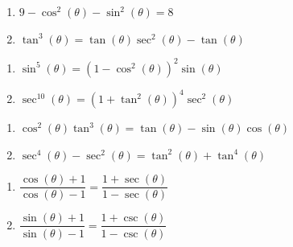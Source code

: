 \begin{multicols}{2}

\begin{enumerate}

\setcounter{enumi}{\value{HW}}

\item $9 - \cos^{2}(\theta) - \sin^{2}(\theta) = 8$
\item $\tan^{3}(\theta) = \tan(\theta)\sec^{2}(\theta) - \tan(\theta)$

\setcounter{HW}{\value{enumi}}

\end{enumerate}

\end{multicols}

\begin{multicols}{2}

\begin{enumerate}

\setcounter{enumi}{\value{HW}}

\item $\sin^{5}(\theta) = \left(1-\cos^{2}(\theta)\right)^{2} \sin(\theta)$
\item $\sec^{10}(\theta) = \left(1 + \tan^{2}(\theta)\right)^4 \sec^{2}(\theta)$

\setcounter{HW}{\value{enumi}}

\end{enumerate}

\end{multicols}

\begin{multicols}{2}

\begin{enumerate}

\setcounter{enumi}{\value{HW}}

\item $\cos^{2}(\theta)\tan^{3}(\theta) = \tan(\theta) - \sin(\theta)\cos(\theta)$
\item $\sec^{4}(\theta) - \sec^{2}(\theta) = \tan^{2}(\theta) + \tan^{4}(\theta)$

\setcounter{HW}{\value{enumi}}

\end{enumerate}

\end{multicols}

\begin{multicols}{2}

\begin{enumerate}

\setcounter{enumi}{\value{HW}}

\item $\dfrac{\cos(\theta) + 1}{\cos(\theta) - 1} = \dfrac{1 + \sec(\theta)}{1 - \sec(\theta)}$
\item $\dfrac{\sin(\theta) + 1}{\sin(\theta) - 1} = \dfrac{1 + \csc(\theta)}{1 - \csc(\theta)}$

\setcounter{HW}{\value{enumi}}

\end{enumerate}

\end{multicols}

